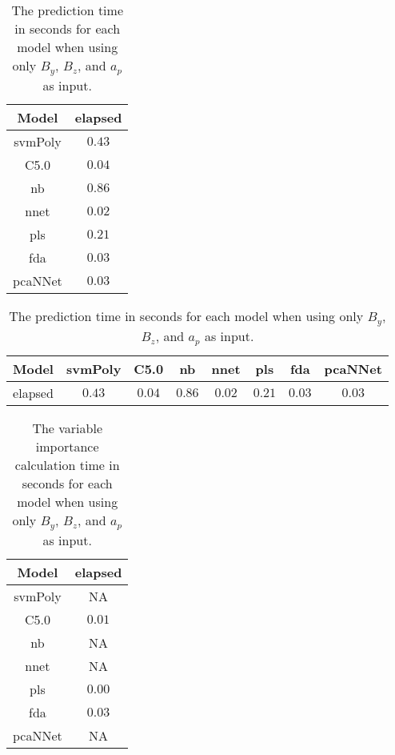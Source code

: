 \begin{table}[!ht]
	\centering
	\begin{tabular}{|c|c|}
		\hline
		Model & elapsed \\ \hline
		svmPoly & $0.43$ \\ \hline
		C5.0 & $0.04$ \\ \hline
		nb & $0.86$ \\ \hline
		nnet & $0.02$ \\ \hline
		pls & $0.21$ \\ \hline
		fda & $0.03$ \\ \hline
		pcaNNet & $0.03$ \\ \hline
	\end{tabular}
	\caption{The prediction time in seconds for each model when using only $B_{y}$, $B_{z}$, and $a_{p}$ as input.}
	\label{tab:time:yzap:predict}
\end{table}

\begin{table}[!ht]
	\centering
	\begin{tabular}{|c|c|c|c|c|c|c|c|}
		\hline
		Model & svmPoly & C5.0 & nb & nnet & pls & fda & pcaNNet \\ \hline
		elapsed & $0.43$ & $0.04$ & $0.86$ & $0.02$ & $0.21$ & $0.03$ & $0.03$ \\ \hline
	\end{tabular}
	\caption{The prediction time in seconds for each model when using only $B_{y}$, $B_{z}$, and $a_{p}$ as input.}
	\label{tab:time:reverse:yzap:predict}
\end{table}

\begin{table}[!ht]
	\centering
	\begin{tabular}{|c|c|}
		\hline
		Model & elapsed \\ \hline
		svmPoly & NA \\ \hline
		C5.0 & $0.01$ \\ \hline
		nb & NA \\ \hline
		nnet & NA \\ \hline
		pls & $0.00$ \\ \hline
		fda & $0.03$ \\ \hline
		pcaNNet & NA \\ \hline
	\end{tabular}
	\caption{The variable importance calculation time in seconds for each model when using only $B_{y}$, $B_{z}$, and $a_{p}$ as input.}
	\label{tab:time:yzap:importance}
\end{table}

